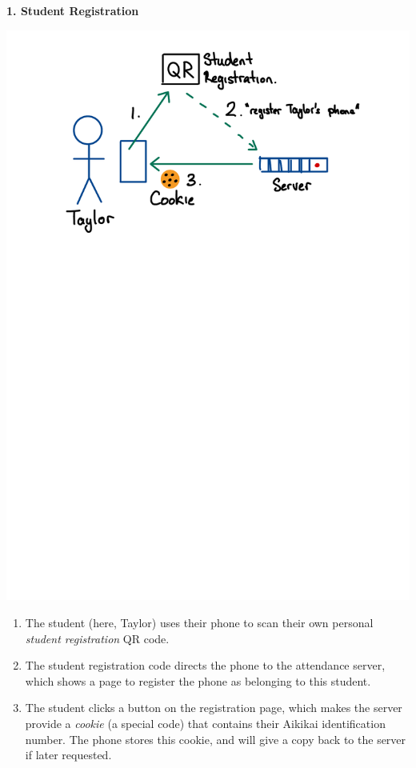 \begin{minipage}[t]{\dimexpr0.5\linewidth-1em}
\textbf{1. Student Registration}
\begin{center}
\includegraphics[scale=0.4]{figure/fig-student-registration.pdf}
\end{center}

\begin{enumerate}
\item The student (here, Taylor) uses their phone to scan their
      own personal \emph{student registration} QR code.

\item The student registration code directs the phone to the
      attendance server, which shows a page to register the phone
      as belonging to this student.

\item The student clicks a button on the registration page,
      which makes the server provide a \emph{cookie} (a special code) that
      contains their Aikikai identification number. The phone stores
      this cookie, and will give a copy back to the server if later requested.
\end{enumerate}


\end{minipage}
